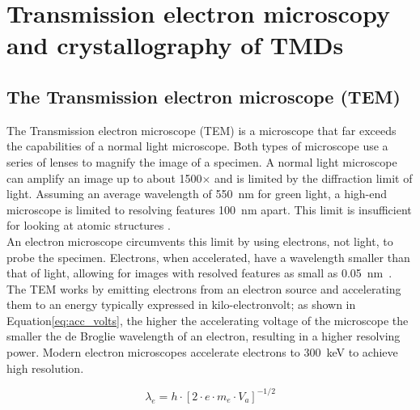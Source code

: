 \chapter{Transmission electron microscopy and crystallography of TMDs}
\label{sec:theory}

\section{The Transmission electron microscope (TEM)}
The Transmission electron microscope (TEM) is a microscope that far exceeds the capabilities of a normal light microscope. Both types of microscope use a series of lenses to magnify the image of a specimen.
A normal light microscope can amplify an image up to about 1500$\times$ and is limited by the diffraction limit of light. Assuming an average wavelength of \SI{550}{\nm} for green light, a high-end microscope is limited to resolving features \SI{100}{\nm} apart. This limit is insufficient for looking at atomic structures \cite{PhysRevLett.106.193905}.\\
An electron microscope circumvents this limit by using electrons, not light, to probe the specimen. Electrons, when accelerated, have a wavelength smaller than that of light, allowing for images with resolved features as small as \SI{0.05}{\nm}~\cite{kisielowski_freitag_bischoff_van}. 
The TEM works by emitting electrons from an electron source and accelerating them to an energy typically expressed in kilo-electronvolt; as shown in Equation\ref{eq:acc_volts}, the higher the accelerating voltage of the microscope the smaller the de Broglie wavelength of an electron, resulting in a higher resolving power. Modern electron microscopes accelerate electrons to \SI{300}{\kilo \electronvolt} to achieve high resolution.

\begin{equation}
    \lambda_e = h\cdot \left[ 2 \cdot e \cdot m_e \cdot V_a \right]^{-1/2}
    \label{eq:acc_volts}
\end{equation}


